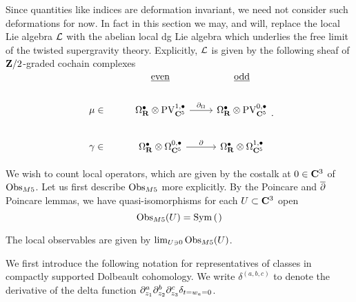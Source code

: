 \documentclass[11pt]{amsart}
\begin{document}
Since quantities like indices are deformation invariant, we need not consider such deformations for now. In fact in this section we may, and will, replace the local Lie algebra $\mathcal L$ with the abelian local dg Lie algebra which underlies the free limit of the twisted supergravity theory.
Explicitly, $\mathcal L$ is given by the following sheaf of $\mathbf{Z}/2$-graded cochain complexes
\[
\begin{tikzcd}
  &  \ul{\rm even} & \ul{\rm odd} \\
 \mu \in & \Omega^{\bullet}_{\R}\otimes\PV^{1,\bullet}_{\C^{5}} \ar[r, "\del_{\Omega}"] & \Omega^{\bullet}_{\R}\otimes\PV^{0,\bullet}_{\C^{5}}\\
 \gamma \in & \Omega^{\bullet}_{\R}\otimes\Omega^{0,\bullet}_{\C^{5}} \ar[r, "\del"]
& \Omega^{\bullet}_{\R}\otimes\Omega^{1,\bullet}_{\C^{5}}\end{tikzcd}
.\]


\parsec

%

We wish to count local operators, which are given by the costalk at $0\in \mathbf{C}^{3}$ of $\operatorname{Obs}_{M5}$. Let us first describe $\operatorname{Obs}_{M5}$ more explicitly. By the Poincare and $\overline{\partial}$ Poincare lemmas, we have quasi-isomorphisms for each $U\subset \mathbf{C}^{3}$ open
\[
\Obs_{M5}(U) = \Sym \left( \begin{tikzcd}  \end{tikzcd} \right)
\]

The local observables are given by $\lim _{U\ni 0} \operatorname{Obs}_{M5}(U)$.

We first introduce the following notation for representatives of classes in compactly supported Dolbeault cohomology. We write $\delta^{(a,b,c)}$ to denote the derivative of the delta function $\partial_{z_{1}}^{a}\partial_{z_{2}}^{b}\partial_{z_{3}}^{c}\delta_{t=w_{a}=0}$.
\end{document}
